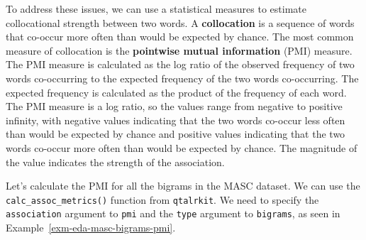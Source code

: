 \documentclass[
  letterpaper,
  DIV=11,
  numbers=noendperiod]{scrreport}
\theoremstyle{definition}
\theoremstyle{remark}
\begin{document}
To address these issues, we can use a statistical measures to estimate
collocational strength between two words. A \textbf{collocation} is a
sequence of words that co-occur more often than would be expected by
chance. The most common measure of collocation is the \textbf{pointwise
mutual information} (PMI) measure. The PMI measure is calculated as the
log ratio of the observed frequency of two words co-occurring to the
expected frequency of the two words co-occurring. The expected frequency
is calculated as the product of the frequency of each word. The PMI
measure is a log ratio, so the values range from negative to positive
infinity, with negative values indicating that the two words co-occur
less often than would be expected by chance and positive values
indicating that the two words co-occur more often than would be expected
by chance. The magnitude of the value indicates the strength of the
association.

Let's calculate the PMI for all the bigrams in the MASC dataset. We can
use the \texttt{calc\_assoc\_metrics()} function from \texttt{qtalrkit}.
We need to specify the \texttt{association} argument to \texttt{pmi} and
the \texttt{type} argument to \texttt{bigrams}, as seen in
Example~\ref{exm-eda-masc-bigrams-pmi}.
\end{document}

